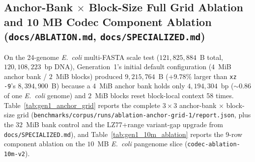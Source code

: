 \documentclass[10pt]{article}
\theoremstyle{definition}
\begin{document}
\subsection{Anchor-Bank $\times$ Block-Size Full Grid Ablation and 10 MB Codec Component Ablation (\texttt{docs/ABLATION.md}, \texttt{docs/SPECIALIZED.md})}

On the 24-genome \textit{E.~coli} multi-FASTA scale test ($121,825,884$~B total, $120,108,223$~bp DNA), Generation~1's initial default configuration ($4$~MiB anchor bank / $2$~MiB blocks) produced $9,215,764$~B ($+9.78\%$ larger than \texttt{xz -9}'s $8,394,900$~B) because a $4$~MiB anchor bank holds only $4,194,304$~bp ($\sim 0.86$ of one \textit{E.~coli} genome) and $2$~MiB blocks reset block-local context 58 times. Table~\ref{tab:gen1_anchor_grid} reports the complete $3\times 3$ anchor-bank $\times$ block-size grid (\texttt{benchmarks/corpus/runs/ablation-anchor-grid-1/report.json}, plus the $32$~MiB bank control and the LZ77+range variant-gap upgrade from \texttt{docs/SPECIALIZED.md}), and Table~\ref{tab:gen1_10m_ablation} reports the 9-row component ablation on the $10$~MB \textit{E.~coli} pangenome slice (\texttt{codec-ablation-10m-v2}).
\end{document}
